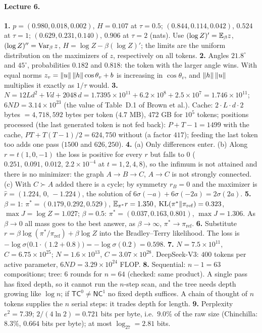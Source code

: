 \paragraph{Lecture 6.}
\textbf{1.} $p=(0.980,0.018,0.002)$, $H=0.107$ at $\tau=0.5$; $(0.844,0.114,0.042)$, $0.524$ at $\tau=1$; $(0.629,0.231,0.140)$, $0.906$ at $\tau=2$ (nats). Use $(\log Z)'=\mathbb{E}_\beta z$, $(\log Z)''=\operatorname{Var}_\beta z$, $H=\log Z-\beta(\log Z)'$; the limits are the uniform distribution on the maximizers of $z$, respectively on all tokens. \quad
\textbf{2.} Angles $21.8^\circ$ and $45^\circ$, probabilities $0.182$ and $0.818$: the token with the larger angle wins. With equal norms $z_v=\left\lVert u\right\rVert\left\lVert h\right\rVert\cos\theta_v+b$ is increasing in $\cos\theta_v$, and $\left\lVert h\right\rVert\left\lVert u\right\rVert$ multiplies it exactly as $1/\tau$ would. \quad
\textbf{3.} $N=12Ld^2+Vd+2048\,d=1.7395\times10^{11}+6.2\times10^{8}+2.5\times10^{7}=1.746\times10^{11}$; $6ND=3.14\times10^{23}$ (the value of Table~D.1 of Brown et al.). Cache: $2\cdot L\cdot d\cdot2$ bytes $=4{,}718{,}592$ bytes per token ($4.7$ MB), $472$ GB for $10^5$ tokens; positions processed (the last generated token is not fed back): $P+T-1=1499$ with the cache, $PT+T(T-1)/2=624{,}750$ without (a factor $417$); feeding the last token too adds one pass ($1500$ and $626{,}250$). \quad
\textbf{4.} (a) Only differences enter. (b) Along $r=t(1,0,-1)$ the loss is positive for every $r$ but falls to $0$ ($0.251,\,0.091,\,0.012,\,2.2\times10^{-4}$ at $t=1,2,4,8$), so the infimum is not attained and there is no minimizer: the graph $A\to B\to C$, $A\to C$ is not strongly connected. (c) With $C\succ A$ added there is a cycle; by symmetry $r_B=0$ and the maximizer is $\hat r=(1.224,\,0,\,-1.224)$, the solution of $6\sigma(-a)+6\sigma(-2a)=2\sigma(2a)$. \quad
\textbf{5.} $\beta=1$: $\pi^*=(0.179,0.292,0.529)$, $\mathbb{E}_{\pi^*}r=1.350$, $\operatorname{KL}(\pi^*\|\pi_{\mathrm{ref}})=0.323$, $\max J=\log Z=1.027$; $\beta=0.5$: $\pi^*=(0.037,0.163,0.801)$, $\max J=1.306$. As $\beta\to0$ all mass goes to the best answer, as $\beta\to\infty$, $\pi^*\to\pi_{\mathrm{ref}}$. \quad
\textbf{6.} Substitute $r=\beta\log(\pi^*/\pi_{\mathrm{ref}})+\beta\log Z$ into the Bradley--Terry likelihood. The loss is $-\log\sigma\big(0.1\cdot(1.2+0.8)\big)=-\log\sigma(0.2)=0.598$. \quad
\textbf{7.} $N=7.5\times10^{11}$, $C=6.75\times10^{25}$; $N=1.6\times10^{13}$, $C=3.07\times10^{28}$. DeepSeek-V3: $400$ tokens per active parameter, $6ND=3.29\times10^{24}$ FLOP. \quad
\textbf{8.} Sequential: $n-1=63$ compositions; tree: $6$ rounds for $n=64$ (checked: same product). A single pass has fixed depth, so it cannot run the $n$-step scan, and the tree needs depth growing like $\log n$; if $\mathsf{TC}^0\ne\mathsf{NC}^1$ no fixed depth suffices. A chain of thought of $n$ tokens supplies the $n$ serial steps: it trades depth for length. \quad
\textbf{9.} Perplexity $e^{2}=7.39$; $2/(4\ln2)=0.721$ bits per byte, i.e.\ $9.0\%$ of the raw size (Chinchilla: $8.3\%$, $0.664$ bits per byte); at most $\log_27=2.81$ bits.

